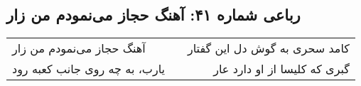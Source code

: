 \begin{center}
\section*{رباعی شماره ۴۱: آهنگ حجاز می‌نمودم من زار}
\label{sec:041}
\begin{longtable}{l p{0.5cm} r}
آهنگ حجاز می‌نمودم من زار
&&
کامد سحری به گوش دل این گفتار
\\
یارب، به چه روی جانب کعبه رود
&&
گبری که کلیسا از او دارد عار
\\
\end{longtable}
\end{center}
